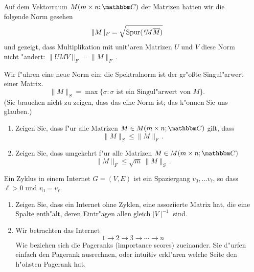 \documentclass[a4,11pt]{article}
\begin{document}
\newpage

\begin{aufgabe}
Auf dem Vektorraum $M(m \times n; \C)$ der Matrizen hatten wir die
folgende Norm gesehen
\[
\| M \|_F = \sqrt{\text{Spur}(\,^t\!M \overline{M})}
\]
und gezeigt, dass Multiplikation mit unit"aren Matrizen $U$
und $V$
diese Norm nicht "andert:
$\| UMV \|_F = \| M \|_F$\,.

Wir f"uhren eine neue Norm ein: die Spektralnorm ist der gr"oßte
Singul"arwert einer Matrix.
\[
\| M \|_S = \max \{ \sigma : \sigma \text{ ist ein Singul"arwert von } M \}.
\]
(Sie brauchen nicht zu zeigen, dass das eine Norm ist; das k"onnen Sie
uns glauben.)
\begin{enumerate}
\item
Zeigen Sie, dass f"ur alle Matrizen $M \in M(m \times n; \C)$ gilt,
dass
\[
\| M \|_S \leq \| M \|_F \,.
\]
\item
  Zeigen Sie, dass umgekehrt f"ur alle Matrizen $M \in M(m \times n;
  \C)$
\[
\| M \|_F \leq \sqrt{m} \ \| M \|_S \,.
\]
\end{enumerate}

\end{aufgabe}

\newpage

\begin{aufgabe}
  Ein Zyklus in einem Internet $G = (V, E)$ ist ein Spaziergang $v_0, \dots v_\ell$, so dass $\ell > 0$ und $v_0 = v_\ell$.
  
  \begin{enumerate}
  \item
  Zeigen Sie, dass ein Internet ohne Zyklen, eine assoziierte Matrix hat, die eine Spalte enth"alt, deren Eintr"agen allen gleich $\mid V \mid^{-1}$ sind.
  \item
  Wir betrachten das Internet
  \[
  1 \to 2 \to 3 \to \cdots \to n
  \]
  Wie beziehen sich die Pageranks (importance scores) zueinander. Sie d"urfen einfach den Pagerank ausrechnen, oder intuitiv erkl"aren welche Seite den h"ohsten Pagerank hat.
  \end{enumerate}
\end{aufgabe}
\end{document}
